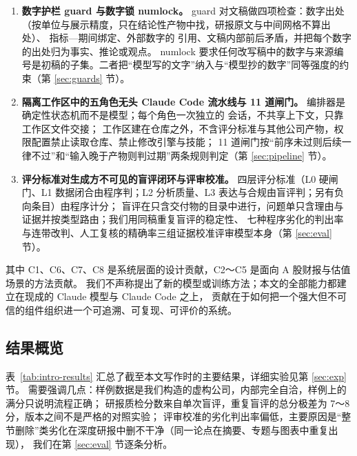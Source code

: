 \begin{enumerate}[label=\textbf{C\arabic*}, leftmargin=2.2em]
  \item \textbf{数字护栏 guard 与数字锁 numlock。}
    guard 对文稿做四项检查：数字出处（按单位与展示精度，只在结论性产物中找，研报原文与中间网格不算出处）、
    指标—期间绑定、外部数字的 \code{[S编号]} 引用、文稿内部前后矛盾，并把每个数字的出处归为事实、推论或观点。
    numlock 要求任何改写稿中的数字与来源编号是初稿的子集。二者把“模型写的文字”纳入与“模型抄的数字”同等强度的约束（第 \ref{sec:guards} 节）。

  \item \textbf{隔离工作区中的五角色无头 Claude Code 流水线与 11 道闸门。}
    编排器是确定性状态机而不是模型；每个角色一次独立的  会话，不共享上下文，只靠工作区文件交接；
    工作区建在仓库之外，不含评分标准与其他公司产物，权限配置禁止读取仓库、禁止修改引擎与技能；
    11 道闸门按“前序未过则后续一律不过”和“输入晚于产物则判过期”两条规则判定（第 \ref{sec:pipeline} 节）。

  \item \textbf{评分标准对生成方不可见的盲评闭环与评审校准。}
    四层评分标准（L0 硬闸门、L1 数据闭合由程序判；L2 分析质量、L3 表达与合规由盲评判；另有负向条目）由程序计分；
    盲评在只含交付物的目录中进行，问题单只含理由与证据并按类型路由；我们用同稿重复盲评的稳定性、
    七种程序劣化的判出率与连带改判、人工复核的精确率三组证据校准评审模型本身（第 \ref{sec:eval} 节）。
\end{enumerate}

其中 C1、C6、C7、C8 是系统层面的设计贡献，C2～C5 是面向 A 股财报与估值场景的方法贡献。
我们不声称提出了新的模型或训练方法；本文的全部能力都建立在现成的 Claude 模型与 Claude Code 之上，
贡献在于如何把一个强大但不可信的组件组织进一个可追溯、可复现、可评价的系统。

\subsection{结果概览}
\label{sec:intro-results}

表~\ref{tab:intro-results} 汇总了截至本文写作时的主要结果，详细实验见第 \ref{sec:exp} 节。
需要强调几点：样例数据是我们构造的虚构公司，内部完全自洽，样例上的满分只说明流程正确；
研报质检分数来自单次盲评，重复盲评的总分极差为 7～8 分，版本之间不是严格的对照实验；
评审校准的劣化判出率偏低，主要原因是“整节删除”类劣化在深度研报中删不干净（同一论点在摘要、专题与图表中重复出现），
我们在第 \ref{sec:eval} 节逐条分析。

